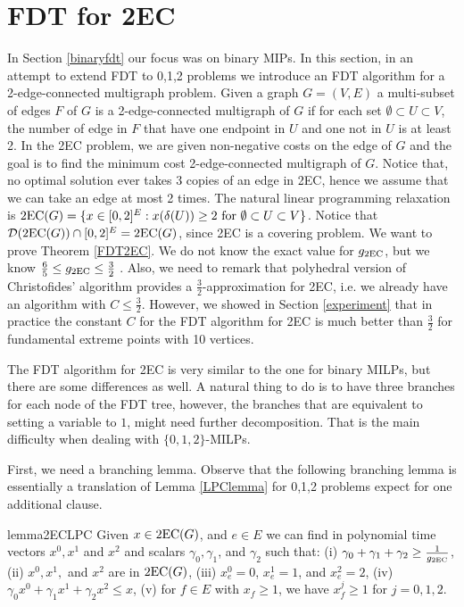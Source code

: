 
\section{FDT for 2EC}\label{2EC}

In Section \ref{binaryfdt} our focus was on binary MIPs. In this section, in an attempt to extend FDT to 0,1,2 problems we introduce an FDT algorithm for a 2-edge-connected multigraph problem. Given a graph $G=(V,E)$ a multi-subset of edges $F$ of $G$ is a 2-edge-connected multigraph of $G$ if for each set $\emptyset\subset U \subset V$, the number of edge in $F$ that have one endpoint in $U$ and one not in $U$ is at least 2. In the 2EC problem, we are given non-negative costs on the edge of $G$ and the goal is to find the minimum cost 2-edge-connected multigraph of $G$. Notice that, no optimal solution ever takes 3 copies of an edge in 2EC, hence we assume that we can take an edge at most 2 times. The natural linear programming relaxation is $\operatorname{2EC}(G) = \{x\in [0,2]^E: x(\delta(U))\geq 2 \mbox{ for } \emptyset \subset U \subset V\}$. Notice that $\operatorname{\mathcal{D}}(\operatorname{2EC}(G))\cap [0,2]^{E} = \operatorname{2EC}(G)$, since 2EC is a covering problem. We want to prove Theorem \ref{FDT2EC}.
We do not know the exact value for $g_{\operatorname{2EC}}$, but we know $\frac{6}{5} \leq g_{\operatorname{2EC}} \leq \frac{3}{2}$ \cite{carr-ravi,Wolsey1980}. Also, we need to remark that polyhedral version of Christofides' algorithm provides a $\frac{3}{2}$-approximation for 2EC, i.e. we already have an algorithm with $C\leq \frac{3}{2}$. However, we showed in Section \ref{experiment} that in practice the constant $C$ for the FDT algorithm for 2EC is much better than $\frac{3}{2}$ for fundamental extreme points with 10 vertices.

The FDT algorithm for 2EC is very similar to the one for binary MILPs, but there are some differences as well. A natural thing to do is to have three branches for each node of the FDT tree, however, the branches that are equivalent to setting a variable to $1$, might need further decomposition. That is the main difficulty when dealing with $\{0,1,2\}$-MILPs.

First, we need a branching lemma. Observe that  the following branching lemma is essentially a translation of Lemma \ref{LPClemma} for 0,1,2 problems expect for one additional clause. 

\begin{restatable}{lemma}{2ECLPC}
	\label{LPC2EC}
	Given $x\in \operatorname{2EC}(G)$, and $e\in E$ we can find in polynomial time vectors $x^0,x^1$ and $x^2$ and scalars $\gamma_0,\gamma_1$, and $\gamma_2$ such that: (i) $\gamma_0 + \gamma_1 +\gamma_2 \geq \frac{ 1}{g_{\operatorname{2EC}}}$, (ii) $x^0,x^1,$ and $x^2$ are in  $ \operatorname{2EC}(G)$, (iii) $x^0_e=0$, $x^1_e=1$, and $x^2_e=2$, (iv) $\gamma_0 x^0 + \gamma_1{x}^1  + \gamma_2x^2\leq {x}$, (v) for $f\in E$ with ${x}_f\geq 1$, we have $x^j_f\geq 1$ for $j=0,1,2$.
\end{restatable}

